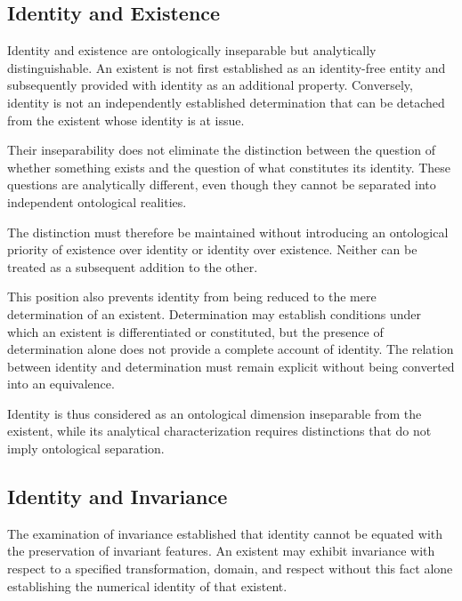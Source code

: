 
\subsection{Identity and Existence}

Identity and existence are ontologically inseparable but
analytically distinguishable. An existent is not first
established as an identity-free entity and subsequently
provided with identity as an additional property. Conversely,
identity is not an independently established determination
that can be detached from the existent whose identity is at
issue.

Their inseparability does not eliminate the distinction
between the question of whether something exists and the
question of what constitutes its identity. These questions
are analytically different, even though they cannot be
separated into independent ontological realities.

The distinction must therefore be maintained without
introducing an ontological priority of existence over identity
or identity over existence. Neither can be treated as a
subsequent addition to the other.

This position also prevents identity from being reduced to
the mere determination of an existent. Determination may
establish conditions under which an existent is differentiated
or constituted, but the presence of determination alone does
not provide a complete account of identity. The relation
between identity and determination must remain explicit
without being converted into an equivalence.

Identity is thus considered as an ontological dimension
inseparable from the existent, while its analytical
characterization requires distinctions that do not imply
ontological separation.


\subsection{Identity and Invariance}

The examination of invariance established that identity
cannot be equated with the preservation of invariant features.
An existent may exhibit invariance with respect to a specified
transformation, domain, and respect without this fact alone
establishing the numerical identity of that existent.

